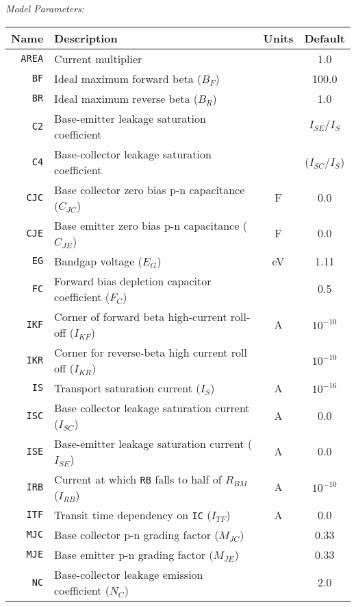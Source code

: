\documentclass{article}
\begin{document}
\noindent\textit{Model Parameters:}\\
\newline
\begin{tabular}{|r|l|c|c|} \hline
\textbf{Name} & \textbf{Description} & \textbf{Units} & \textbf{Default} \\
\hline
\texttt{AREA} & Current multiplier & & 1.0 \\
\hline
\texttt{BF} & Ideal maximum forward beta ($B_F$) & & 100.0 \\
\hline
\texttt{BR} & Ideal maximum reverse beta ($B_R$) & & 1.0  \\
\hline
\texttt{C2} & Base-emitter leakage saturation coefficient & & $I_{SE} / I_S$ \\
\hline
\texttt{C4} & Base-collector leakage saturation coefficient & & ($I_{SC} / I_S$) \\
\hline
\texttt{CJC} & Base collector zero bias p-n capacitance ($C_{JC}$) & F &  0.0\\
\hline
\texttt{CJE} & Base emitter zero bias p-n capacitance ($C_{JE}$) & F & 0.0\\
\hline
\texttt{EG} & Bandgap voltage ($E_G$) & eV & 1.11 \\
\hline
\texttt{FC} & Forward bias depletion capacitor coefficient ($F_C$) & & 0.5 \\
\hline
\texttt{IKF} & Corner of forward beta high-current roll-off ($I_{KF}$) & A & $10^{-10}$ \\
\hline
\texttt{IKR} & Corner for reverse-beta high current roll off ($I_{KR}$) & & $10^{-10}$ \\
\hline
\texttt{IS} & Transport saturation current ($I_S$) & A & $10^{-16}$  \\
\hline
\texttt{ISC} & Base collector leakage saturation current ($I_{SC}$) & A & 0.0 \\
\hline
\texttt{ISE} & Base-emitter leakage saturation current ($I_{SE}$) & A & 0.0\\
\hline
\texttt{IRB} & Current at which \texttt{RB} falls to half of \texttt{$R_{BM}$} ($I_{RB}$) & A & $10^{-10}$ \\
\hline
\texttt{ITF} & Transit time dependency on \texttt{IC} ($I_{TF}$) & A & 0.0 \\
\hline
\texttt{MJC} & Base collector p-n grading factor ($M_{JC}$) & & 0.33 \\
\hline
\texttt{MJE} & Base emitter p-n grading factor ($M_{JE}$) & & 0.33 \\
\hline
\texttt{NC} & Base-collector leakage emission coefficient ($N_C$) & & 2.0\\

\end{tabular}
\end{document}
